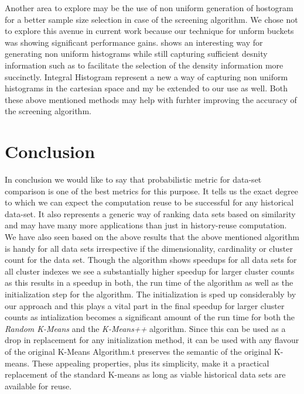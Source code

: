 \documentclass{vldb}
\begin{document}
Another area to explore may be the use of non uniform generation of hostogram for a better sample size selection in case of the screening algorithm. We chose not to explore this avenue in current work because our technique for unform buckets was showing significant performance gains. \cite{non_uniform_hist_1} shows an interesting way for generating non uniform histograms while still capturing sufficient desnity information such as to facilitate the selection of the density information more succinctly. Integral Histogram\cite{non_uniform_hist_2} represent a new a way of capturing non uniform histograms in the cartesian space and my be extended to our use as well. Both these above mentioned methods may help with furhter improving the accuracy of the screening algorithm.

\section{Conclusion}
\label{chap-seven}
In conclusion we would like to say that probabilistic metric for data-set comparison is
one of the best metrics for this purpose. It tells us the exact degree to which we can
expect the computation reuse to be successful for any historical data-set. It also represents a generic way of ranking data sets based on similarity and may have many more applications than just in history-reuse computation. We have also seen based on the above
results that the above mentioned algorithm is handy for all data sets irrespective if the dimensionality, cardinality or cluster count for the data set.
Though the algorithm shows speedups for all data sets for all cluster indexes we see a substantially higher speedup for larger cluster counts as this results in a speedup in both, the run time of the algorithm as well as the initialization step for the algorithm. The initialization is sped up considerably by our approach and this plays a vital part in the final speedup for larger cluster counts as intialization becomes a significant amount of the run time for both the \textit{Random K-Means} and the \textit{K-Means++} algorithm.
Since this can be used as a drop in replacement for any initialization method, it can be used with any flavour of the original K-Means Algorithm.t preserves the semantic of the original K-means. These appealing properties, plus its simplicity, make it a
practical replacement of the standard K-means as long as viable historical data sets are available for reuse.

\balance
\end{document}
